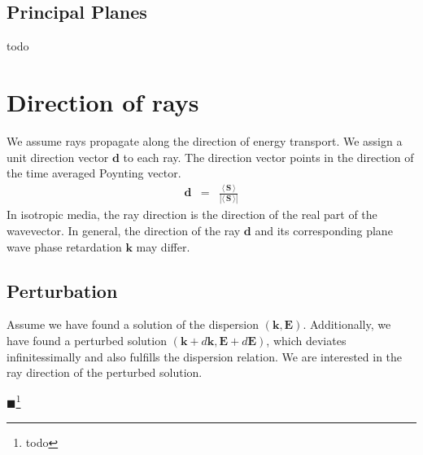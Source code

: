\documentclass[12pt,a4paper,twoside,openright,BCOR10mm,headsepline,titlepage,abstracton,chapterprefix,final]{scrreprt}
\newcommand\Vector[1]{{\mathbf{#1}}}
\newcommand\wavenumber{k}
\newcommand\Wavevector{\Vector{\wavenumber}}
\newcommand\scalarEfield{E}
\newcommand\Efield{\Vector{\scalarEfield}}
\newcommand{\timeavg}[1]{{\langle\,#1\,\rangle}}
\newcommand{\remark}[1]{{\color{red}$\blacksquare$}\footnote{{\color{red}#1}}}
\begin{document}
\subsection{Principal Planes}
todo


\section{Direction of rays} \label{sec:raydir}
We assume rays propagate along the direction of energy transport.
We assign a unit direction vector $\Vector{d}$ to each ray.
The direction vector points in the direction of the time averaged Poynting vector.
\begin{eqnarray}
 \Vector{d} &=& \frac{\timeavg{\Vector{S}}}{|\timeavg{\Vector{S}}|}
\end{eqnarray}
In isotropic media, the ray direction is the direction of the real part of the wavevector.
In general, the direction of the ray $\Vector{d}$ and its corresponding plane wave phase retardation $\Vector{k}$ may differ.

\subsection{Perturbation}
Assume we have found a solution of the dispersion $( \Wavevector, \Efield )$.
Additionally, we have found a perturbed solution $( \Wavevector + d \Wavevector, \Efield + d \Efield)$, 
which deviates infinitessimally and also fulfills the dispersion relation.
We are interested in the ray direction of the perturbed solution.


\remark{todo}
\end{document}
